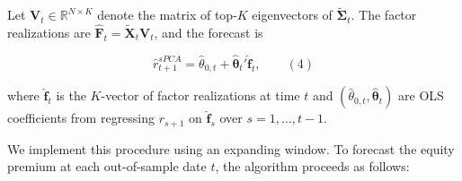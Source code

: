 \documentclass[a4paper,11pt]{article}
\begin{document}
Let $\mathbf{V}_t \in \mathbb{R}^{N \times K}$ denote the matrix of top-$K$ eigenvectors of $\tilde{\mathbf{\Sigma}}_t$. The factor realizations are $\hat{\mathbf{F}}_t = \tilde{\mathbf{X}}_t \mathbf{V}_t$, and the forecast is

$$\hat{r}^{sPCA}_{t+1} = \hat{\theta}_{0,t} + \hat{\boldsymbol{\theta}}_t' \hat{\mathbf{f}}_t, \qquad (4)$$

where $\hat{\mathbf{f}}_t$ is the $K$-vector of factor realizations at time $t$ and $(\hat{\theta}_{0,t}, \hat{\boldsymbol{\theta}}_t)$ are OLS coefficients from regressing $r_{s+1}$ on $\hat{\mathbf{f}}_s$ over $s = 1, \ldots, t-1$.

We implement this procedure using an expanding window. To forecast the equity premium at each out-of-sample date $t$, the algorithm proceeds as follows:
\end{document}
